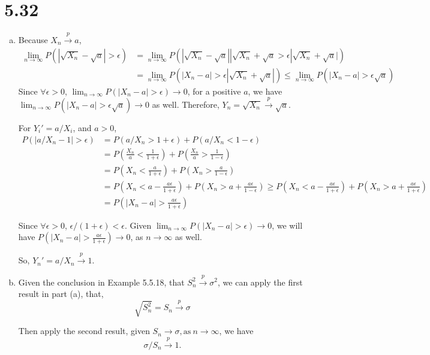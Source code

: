 \documentclass[letterpaper]{article}
\begin{document}
    \section*{5.32}
    \begin{enumerate}[(a)]
    \item Because $X_n \stackrel{p}{\rightarrow} a$, 
    \begin{align*}
    \lim_{n\to\infty} P(|\sqrt{X_n} - \sqrt{a}| > \epsilon) & = \lim_{n\to\infty}P(|\sqrt{X_n} - \sqrt{a}||\sqrt{X_n} + \sqrt{a} > \epsilon|\sqrt{X_n} + \sqrt{a}|) \\
    & = \lim_{n\to\infty} P(|X_n - a| > \epsilon|\sqrt{X_n} + \sqrt{a}|) \le \lim_{n\to\infty} P(|X_n -a | > \epsilon\sqrt{a})
    \end{align*}
    Since $\forall \epsilon > 0$, $\lim_{n\to\infty} P(|X_n -a| > \epsilon) \to 0$, for a positive $a$, we have $\lim_{n\to\infty} P(|X_n -a | > \epsilon\sqrt{a}) \to 0$ as well.
    Therefore, $Y_n = \sqrt{X_n} \stackrel{p}{\rightarrow} \sqrt{a}$.

    For $Y_i' = a/X_i$, and $a > 0$, 
    \begin{align*}
    P(|a/X_n - 1| > \epsilon) & = P(a/X_n > 1 + \epsilon) + P(a/X_n < 1 - \epsilon) \\
    & = P(\frac{X_n}{a} < \frac{1}{1+\epsilon}) + P(\frac{X_n}{a} > \frac{1}{1-\epsilon}) \\
    & = P(X_n < \frac{a}{1+\epsilon}) + P(X_n > \frac{a}{1-\epsilon}) \\
    & = P(X_n < a - \frac{a\epsilon}{1+\epsilon}) + P(X_n > a + \frac{a\epsilon}{1-\epsilon}) \ge P(X_n < a - \frac{a\epsilon}{1+\epsilon}) + P(X_n > a + \frac{a\epsilon}{1+\epsilon})   \\
    & = P(|X_n - a| > \frac{a\epsilon}{1+\epsilon})
    \end{align*}

    Since $\forall \epsilon > 0$, $\epsilon/(1+\epsilon) < \epsilon$. Given $\lim_{n\to\infty} P(|X_n - a| > \epsilon) \to 0$, we will have $P(|X_n - a| > \frac{a\epsilon}{1+\epsilon}) \to 0$, as $n\to\infty$ as well.

    So, $Y_n' = a/X_n \stackrel{p}{\rightarrow} 1.$
    
    \item Given the conclusion in Example 5.5.18, that $S_n^2 \stackrel{p}{\rightarrow} \sigma^2$, we can apply the first result in part (a), that, 
    \[
    \sqrt{S_n^2} = S_n \stackrel{p}{\rightarrow} \sigma
    \]

    Then apply the second result, given $S_n \to \sigma, \text{as}~ n\to\infty$, we have 
    \[
    \sigma/S_n \stackrel{p}{\rightarrow} 1.
    \]
    \end{enumerate}
    
\end{document}
